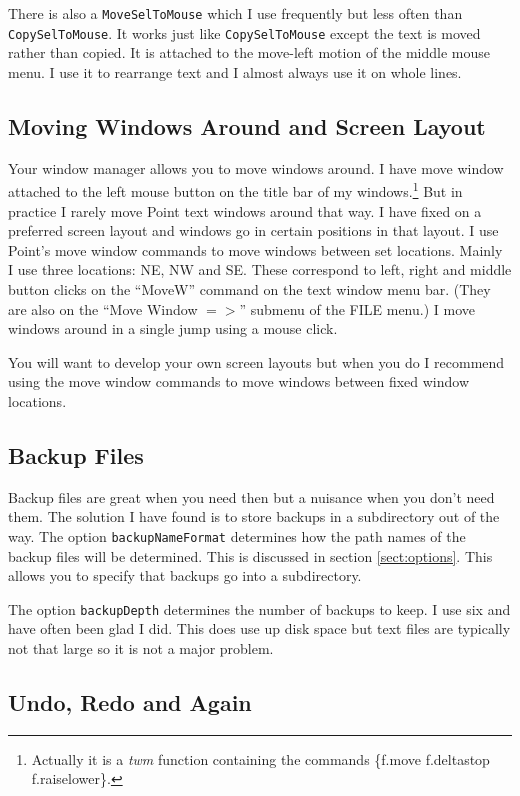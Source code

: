 There is also a {\tt MoveSelToMouse} which I use frequently
but less often than {\tt CopySelToMouse}.
It works just like {\tt CopySelToMouse} except the text is
moved rather than copied.
It is attached to the move-left motion of the middle mouse menu.
I use it to rearrange text and I almost always use it on whole lines.



\subsection{ Moving Windows Around and Screen Layout}

Your window manager allows you to move windows around.
I have move window attached to the left mouse button on the
title bar of my windows.\footnote{Actually it is a {\it twm}
function containing the commands \{f.move f.deltastop f.raiselower\}.}
But in practice I rarely move Point text windows around that way.
I have fixed on a preferred screen layout and windows go in certain
positions in that layout.
I use Point's move window commands to move windows between set
locations.
Mainly I use three locations: NE, NW and SE.
These correspond to left, right and middle button clicks on the
``MoveW'' command on the text window menu bar.
(They are also on the ``Move Window $=>$'' submenu of the FILE menu.)
I move windows around in a single jump using a mouse click.

You will want to develop your own screen layouts but when you do
I recommend using the move window commands to move windows
between fixed window locations.


\subsection{Backup Files}

Backup files are great when you need then but a nuisance when you don't
need them.
The solution I have found is to store backups in a subdirectory out
of the way.
The option {\tt backupNameFormat} determines how the path names of
the backup files will be determined.
This is discussed in section \ref{sect:options}.
This allows you to specify that backups go into a subdirectory.

The option {\tt backupDepth} determines the number of backups to keep.
I use six and have often been glad I did.
This does use up disk space but text files are typically not that
large so it is not a major problem.


\subsection{Undo, Redo and Again}


